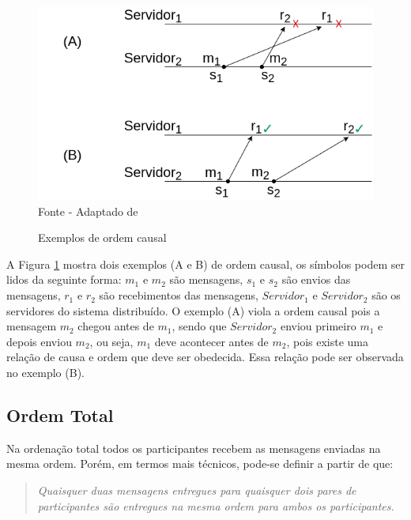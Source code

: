 
\begin{figure}[htb!]
\centering
\caption{Exemplos de ordem causal}
\includegraphics[width=0.8\linewidth]{figures/causal-order-works.drawio.png}
{\flushleft Fonte - Adaptado de \textcite{PauloVerissimoLuisRodrigues}}
\label{fig:causal-order-works}
\end{figure}

A Figura \ref{fig:causal-order-works} mostra dois exemplos (A e B) de ordem causal, os símbolos podem ser lidos da seguinte forma: $m_1$ e $m_2$ são mensagens, $s_1$ e $s_2$ são envios das mensagens, $r_1$ e $r_2$ são recebimentos das mensagens, $Servidor_1$ e $Servidor_2$ são os servidores do sistema distribuído. O exemplo (A) viola a ordem causal pois a mensagem $m_2$ chegou antes de $m_1$, sendo que $Servidor_2$ enviou primeiro $m_1$ e depois enviou $m_2$, ou seja, $m_1$ deve acontecer antes de $m_2$, pois existe uma relação de causa e ordem que deve ser obedecida. Essa relação pode ser observada no exemplo (B).

\subsection{Ordem Total}

Na ordenação total todos os participantes recebem as mensagens enviadas na mesma ordem. Porém, em termos mais técnicos, pode-se definir a partir de \textcite{PauloVerissimoLuisRodrigues} que:

\begin{quote}
\textit{Quaisquer duas mensagens entregues para quaisquer dois pares de participantes são entregues na mesma ordem para ambos os participantes.}
\end{quote}

